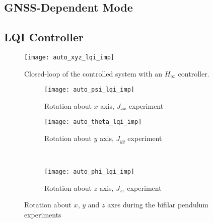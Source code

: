 \begin{appendices}
\section*{GNSS-Dependent Mode}

\subsection*{LQI Controller}

\begin{figure}[h]
	\begin{center}
	\texttt{[image: auto\_xyz\_lqi\_imp]}
	\caption{Closed-loop of the controlled system with an $H_{\infty}$ controller.}
	\label{fig:auto_xyz_lqi_imp}
	\end{center}
	\end{figure}
	
\begin{figure}[H]
\begin{subfigure}{.5\linewidth}
\centering
\texttt{[image: auto\_psi\_lqi\_imp]}
\caption{Rotation about $x$ axis, $J_{xx}$ experiment}
\label{fig:auto_psi_lqi_imp}
\end{subfigure}%
\begin{subfigure}{.5\linewidth}
\centering
\texttt{[image: auto\_theta\_lqi\_imp]}
\caption{Rotation about $y$ axis, $J_{yy}$ experiment}
\label{fig:auto_theta_lqi_imp}
\end{subfigure}\\[1ex]
\begin{subfigure}{\linewidth}
\centering
\texttt{[image: auto\_phi\_lqi\_imp]}
\caption{Rotation about $z$ axis, $J_{zz}$ experiment}
\label{fig:auto_psi_lqi_imp}
\end{subfigure}
\caption{Rotation about $x$, $y$ and $z$ axes during the bifilar pendulum experiments}
\label{fig:auto_lqi_imp}
\end{figure}



\end{appendices}
